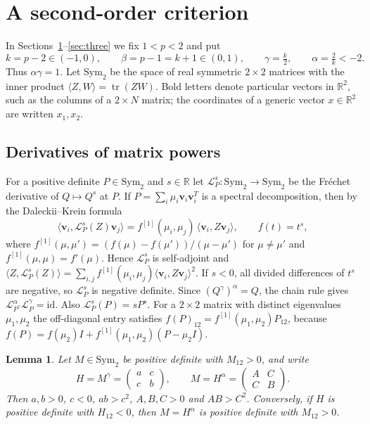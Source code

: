 \documentclass[11pt]{amsart}
\newtheorem{lemma}[theorem]{Lemma}
\theoremstyle{definition}
\theoremstyle{remark}
\numberwithin{equation}{section}
\newcommand{\R}{\mathbb{R}}
\newcommand{\tr}{\operatorname{tr}}
\newcommand{\Sym}{\mathrm{Sym}_2}
\newcommand{\cL}{\mathcal{L}}
\newcommand{\ip}[2]{\langle #1,#2\rangle}
\newcommand{\bv}{\mathbf{v}}
\begin{document}
\section{A second-order criterion}\label{sec:criterion}

In Sections~\ref{sec:criterion}--\ref{sec:three} we fix $1<p<2$ and put
\begin{equation}\label{eq:params}
k=p-2\in(-1,0),\qquad \beta=p-1=k+1\in(0,1),\qquad \gamma=\tfrac k2,\qquad \alpha=\tfrac2k<-2 .
\end{equation}
Thus $\alpha\gamma=1$. Let $\Sym$ be the space of real symmetric $2\times2$ matrices with the inner product $\ip ZW=\tr(ZW)$. Bold letters denote particular vectors in $\R^2$, such as the columns of a $2\times N$ matrix; the coordinates of a generic vector $x\in\R^2$ are written $x_1,x_2$.

\subsection{Derivatives of matrix powers}
For a positive definite $P\in\Sym$ and $s\in\R$ let $\cL^s_P\colon\Sym\to\Sym$ be the Fr\'echet derivative of $Q\mapsto Q^s$ at $P$. If $P=\sum_i\mu_i\bv_i\bv_i^T$ is a spectral decomposition, then by the Daleckii--Krein formula \cite[Section~V.3]{Bha97}
\begin{equation}\label{eq:DK}
\ip{\bv_i}{\cL^s_P(Z)\bv_j}=f^{[1]}(\mu_i,\mu_j)\,\ip{\bv_i}{Z\bv_j},\qquad f(t)=t^s,
\end{equation}
where $f^{[1]}(\mu,\mu')=(f(\mu)-f(\mu'))/(\mu-\mu')$ for $\mu\ne\mu'$ and $f^{[1]}(\mu,\mu)=f'(\mu)$. Hence $\cL^s_P$ is self-adjoint and $\ip Z{\cL^s_P(Z)}=\sum_{i,j}f^{[1]}(\mu_i,\mu_j)\ip{\bv_i}{Z\bv_j}^2$. If $s<0$, all divided differences of $t^s$ are negative, so $\cL^s_P$ is negative definite. Since $(Q^\gamma)^\alpha=Q$, the chain rule gives $\cL^\alpha_{P^\gamma}\cL^\gamma_P=\mathrm{id}$. Also $\cL^s_P(P)=sP^s$. For a $2\times2$ matrix with distinct eigenvalues $\mu_1,\mu_2$ the off-diagonal entry satisfies $f(P)_{12}=f^{[1]}(\mu_1,\mu_2)P_{12}$, because $f(P)=f(\mu_2)I+f^{[1]}(\mu_1,\mu_2)(P-\mu_2I)$.

\begin{lemma}\label{lem:signs}
Let $M\in\Sym$ be positive definite with $M_{12}>0$, and write
\[
H=M^\gamma=\begin{pmatrix}a&c\\ c&b\end{pmatrix},\qquad M=H^\alpha=\begin{pmatrix}A&C\\ C&B\end{pmatrix}.
\]
Then $a,b>0$, $c<0$, $ab>c^2$, $A,B,C>0$ and $AB>C^2$. Conversely, if $H$ is positive definite with $H_{12}<0$, then $M=H^\alpha$ is positive definite with $M_{12}>0$.
\end{lemma}
\end{document}
